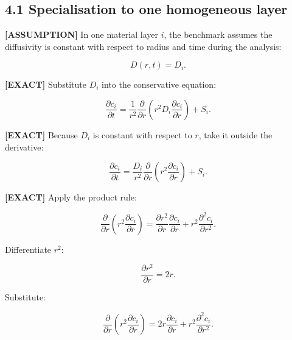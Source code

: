 \documentclass[11pt,a4paper]{article}
\begin{document}
\subsection*{4.1 Specialisation to one homogeneous layer}

\textbf{[ASSUMPTION]} In one material layer $i$, the benchmark assumes the diffusivity is constant with respect to radius and time during the analysis:

\begin{equation}
D(r,t)=D_i.
\tag{TRISO-SPH-034}
\label{eq:triso-sph-034}
\end{equation}

\textbf{[EXACT]} Substitute $D_i$ into the conservative equation:

\begin{equation}
\frac{\partial c_i}{\partial t}=\frac1{r^2}\frac{\partial}{\partial r}\left(r^2D_i\frac{\partial c_i}{\partial r}\right)+S_i.
\tag{TRISO-SPH-035}
\label{eq:triso-sph-035}
\end{equation}

\textbf{[EXACT]} Because $D_i$ is constant with respect to $r$, take it outside the derivative:

\begin{equation}
\frac{\partial c_i}{\partial t}=\frac{D_i}{r^2}\frac{\partial}{\partial r}\left(r^2\frac{\partial c_i}{\partial r}\right)+S_i.
\tag{TRISO-SPH-036}
\label{eq:triso-sph-036}
\end{equation}

\textbf{[EXACT]} Apply the product rule:

\begin{equation}
\frac{\partial}{\partial r}\left(r^2\frac{\partial c_i}{\partial r}\right)=\frac{\partial r^2}{\partial r}\frac{\partial c_i}{\partial r}+r^2\frac{\partial^2c_i}{\partial r^2}.
\tag{TRISO-SPH-037}
\label{eq:triso-sph-037}
\end{equation}

Differentiate $r^2$:

\begin{equation}
\frac{\partial r^2}{\partial r}=2r.
\tag{TRISO-SPH-038}
\label{eq:triso-sph-038}
\end{equation}

Substitute:

\begin{equation}
\frac{\partial}{\partial r}\left(r^2\frac{\partial c_i}{\partial r}\right)=2r\frac{\partial c_i}{\partial r}+r^2\frac{\partial^2c_i}{\partial r^2}.
\tag{TRISO-SPH-039}
\label{eq:triso-sph-039}
\end{equation}
\end{document}

